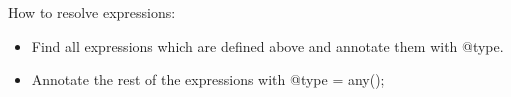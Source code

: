 \documentclass[main.tex]{subfiles}
\begin{document}
    
    \begin{prooftree}
    \end{prooftree}    
    \hrulefill
        
    
    \begin{prooftree}
    \end{prooftree}    
    \hrulefill
         
    
    \begin{prooftree}
    \end{prooftree}    
    \hrulefill
    
    How to resolve expressions:
    \begin{itemize}
        \item Find all expressions which are defined above and annotate them with @type.
        \item Annotate the rest of the expressions with @type = any();
    \end{itemize}

       
\end{document}
